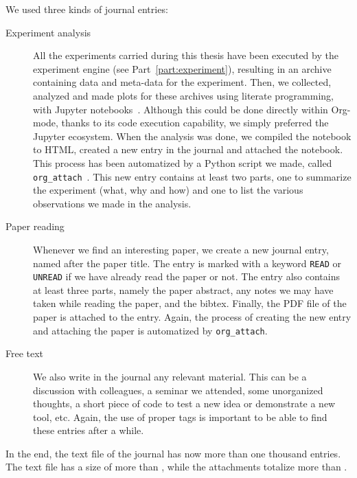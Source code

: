     We used three kinds of journal entries:
    \begin{description}
        \item[Experiment analysis] All the experiments carried during this thesis have been executed by the \peanut
            experiment engine (see Part~\ref{part:experiment}), resulting in an archive containing data and meta-data
            for the experiment. Then, we collected, analyzed and made plots for these archives using literate
            programming, with Jupyter notebooks~\cite{jupyter}. Although this could be done directly within Org-mode,
            thanks to its code execution capability, we simply preferred the Jupyter ecosystem. When the analysis was
            done, we compiled the notebook to HTML, created a new entry in the journal and attached the notebook. This
            process has been automatized by a Python script we made, called \texttt{org\_attach}~\cite{org_attach}. This
            new entry contains at least two parts, one to summarize the experiment (what, why and how) and one to list
            the various observations we made in the analysis.
        \item[Paper reading] Whenever we find an interesting paper, we create a new journal entry, named after the paper
            title. The entry is marked with a keyword \texttt{READ} or \texttt{UNREAD} if we have already read the
            paper or not. The entry also contains at least three parts, namely the paper abstract, any notes we may have
            taken while reading the paper, and the bibtex. Finally, the PDF file of the paper is attached to the entry.
            Again, the process of creating the new entry and attaching the paper is automatized by \texttt{org\_attach}.
        \item[Free text] We also write in the journal any relevant material. This can be a discussion with colleagues,
            a seminar we attended, some unorganized thoughts, a short piece of code to test a new idea or demonstrate a
            new tool, etc. Again, the use of proper tags is important to be able to find these entries after a while.
    \end{description}

    In the end, the text file of the journal has now more than one thousand entries. The text file has a size of more
    than , while the attachments totalize more than .


